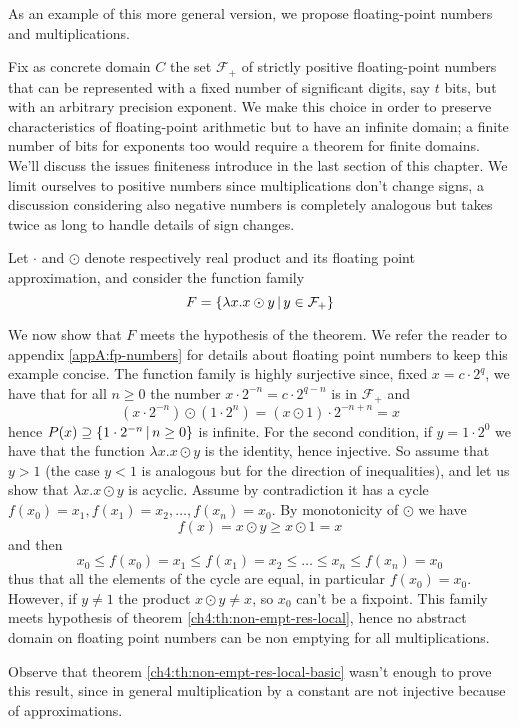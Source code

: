 As an example of this more general version, we propose floating-point numbers and multiplications.
\begin{example}\label{ch4:ex:fp-numbers-local}
	Fix as concrete domain $C$ the set $\mathcal{F_+}$ of strictly positive floating-point numbers that can be represented with a fixed number of significant digits, say $t$ bits, but with an arbitrary precision exponent. We make this choice in order to preserve characteristics of floating-point arithmetic but to have an infinite domain; a finite number of bits for exponents too would require a theorem for finite domains. We'll discuss the issues finiteness introduce in the last section of this chapter. We limit ourselves to positive numbers since multiplications don't change signs, a discussion considering also negative numbers is completely analogous but takes twice as long to handle details of sign changes.

	Let $\cdot$ and $\odot$ denote respectively real product and its floating point approximation, and consider the function family
	\[
	F = \{ \lambda x . x \odot y \,\vert\, y \in \mathcal{F_+} \}
	\]

	We now show that $F$ meets the hypothesis of the theorem. We refer the reader to appendix \ref{appA:fp-numbers} for details about floating point numbers to keep this example concise.
	The function family is highly surjective since, fixed $x = c \cdot 2^q$, we have that for all $n \ge 0$ the number
	$x \cdot 2^{-n} = c \cdot 2^{q-n}$ is in $\mathcal{F_+}$ and
	\[
	(x \cdot 2^{-n}) \odot (1 \cdot 2^{n}) = (x \odot 1) \cdot 2^{-n+n} = x
	\]
	hence $P(x) \supseteq \{ 1 \cdot 2^{-n} \,\vert\, n \ge 0 \}$ is infinite.
	For the second condition, if $y = 1 \cdot 2^{0}$ we have that the function $\lambda x. x \odot y$ is the identity, hence injective. So assume that $y > 1$ (the case $y < 1$ is analogous but for the direction of inequalities), and let us show that $\lambda x. x \odot y$ is acyclic. Assume by contradiction it has a cycle $f(x_0) = x_1, f(x_1) = x_2, \dots, f(x_n) = x_0$. By monotonicity of $\odot$ we have
	\[
	f(x) = x \odot y \ge x \odot 1 = x
	\]
	and then
	\[
	x_0 \le f(x_0) = x_1 \le f(x_1) = x_2 \le \dots \le x_n \le f(x_n) = x_0
	\]
	thus that all the elements of the cycle are equal, in particular $f(x_0) = x_0$. However, if $y \neq 1$ the product $x \odot y \neq x$, so $x_0$ can't be a fixpoint.
	This family meets hypothesis of theorem \ref{ch4:th:non-empt-res-local}, hence no abstract domain on floating point numbers can be non emptying for all multiplications.

	Observe that theorem \ref{ch4:th:non-empt-res-local-basic} wasn't enough to prove this result, since in general multiplication by a constant are not injective because of approximations.
\end{example}

